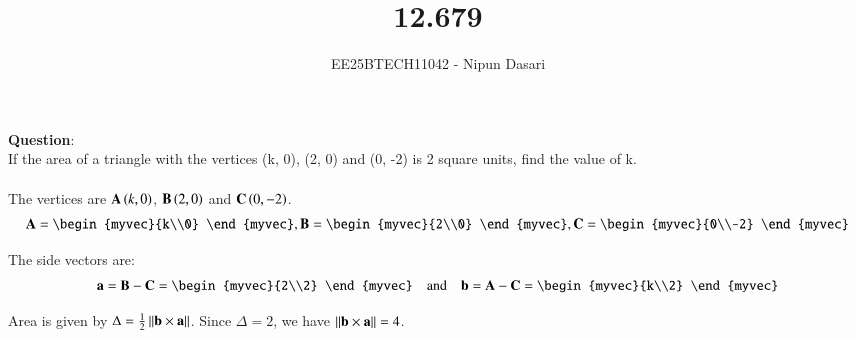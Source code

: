 \documentclass[journal]{IEEEtran}
\begin{document}
	
	
	\vspace{3cm}
	
	\title{12.679}
	\author{EE25BTECH11042 - Nipun Dasari}
	\maketitle
	{\let\newpage\relax\maketitle}
	
	\renewcommand{\thefigure}{\theenumi}
	\renewcommand{\thetable}{\theenumi}
	\setlength{\intextsep}{10pt}
	
	\renewcommand{\thetable}{\theenumi}
	
	\textbf{Question}:\\
	If the area of a triangle with the vertices (k, 0), (2, 0) and (0, -2) is 2 square units, find the value of k. \\ 
	\solution \\
	
	The vertices are $\mathbf{A}\left(k, 0\right)$, $\mathbf{B}\left(2, 0\right)$ and $\mathbf{C}\left(0, -2\right)$.
	\begin{align}
		\vec{A} = \begin{myvec}{k\\0} \end{myvec} , \vec{B} = \begin{myvec}{2\\0} \end{myvec}, \vec{C} = \begin{myvec}{0\\-2} \end{myvec}
	\end{align}
	
	The side vectors are:
	\begin{align}
		\vec{a} = \vec{B}-\vec{C} = \begin{myvec}{2\\2} \end{myvec} && \text{and} && \vec{b} = \vec{A}-\vec{C} = \begin{myvec}{k\\2} \end{myvec}
	\end{align}
	
	Area is given by $\Delta = \frac{1}{2}\left\lVert\mathbf{b}\times\mathbf{a}\right\rVert$. Since $\Delta = 2$, we have $\left\lVert\mathbf{b}\times\mathbf{a}\right\rVert = 4$.
	
\end{document}
